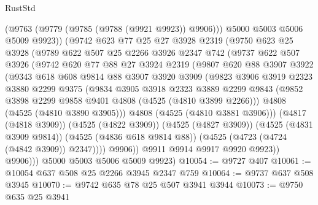 \begin{lexlean}{RustStd}
\begin{coremodule}
{\begin{coremodule}
{{{{{{{{{{{{{{              (@9763 (@9779 (@9785 (@9788 (@9921 @9923)) @9906)))
              @5000
              @5003
              @5006
              @5009
              @9923))
          (@9742
            @623
            @77
            @25
            @27
            @3928
            @2319
            (@9750
              @623
              @25
              @3928
              (@9789
                @622
                @507
                @25
                @2266
                @3926
                @2347
                @742
                (@9737
                  @622
                  @507
                  @3926
                  (@9742
                    @620
                    @77
                    @88
                    @27
                    @3924
                    @2319
                    (@9807
                      @620
                      @88
                      @3907
                      @3922
                      (@9343
                        @618
                        @608
                        @9814
                        @88
                        @3907
                        @3920
                        @3909
                        (@9823
                          @3906
                          @3919
                          @2323
                          @3880
                          @2299
                          @9375
                          (@9834
                            @3905
                            @3918
                            @2323
                            @3889
                            @2299
                            @9843
                            (@9852 @3898 @2299 @9858 @9401 @4808 (@4525 (@4810 @3899 @2266)))
                            @4808
                            (@4525 (@4810 @3890 @3905)))
                          @4808
                          (@4525 (@4810 @3881 @3906)))
                        (@4817 (@4818 @3909))
                        (@4525 (@4822 @3909))
                        (@4525 (@4827 @3909))
                        (@4525 (@4831 @3909 @9814))
                        (@4525 (@4836 @618 @9814 @88))
                        (@4525 (@4723 (@4724 (@4842 @3909)) @2347))))
                    @9906))
                @9911
                @9914
                @9917
                @9920
                @9923))
            @9906)))
      @5000
      @5003
      @5006
      @5009
      @9923)
@10054 := @9727 @407
@10061 := @10054 @637 @508 @25 @2266 @3945 @2347 @759
@10064 := @9737 @637 @508 @3945
@10070 := @9742 @635 @78 @25 @507 @3941 @3944
@10073 := @9750 @635 @25 @3941
}}}}}}}}}}}}}}
\end{coremodule}}
\end{coremodule}
\end{lexlean}
